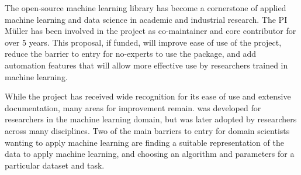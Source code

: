 \vspace{-3mm}
\vspace{-3mm}
The open-source machine learning library \sklearn{} has become a cornerstone of
applied machine learning and data science in academic and industrial research.
The PI M\"uller has been involved in the \sklearn{} project as co-maintainer
and core contributor for over 5 years. This proposal, if funded, will improve
ease of use of the \sklearn{} project, reduce the barrier to entry for
no-experts to use the package, and add automation features that will allow more
effective use by researchers trained in machine learning.

While the \sklearn{} project has received wide recognition for its ease of
use and extensive documentation, many areas for improvement remain.
\sklearn{} was developed for researchers in the machine learning domain,
but was later adopted by researchers across many disciplines.
Two of the main barriers to entry for domain scientists wanting to apply
machine learning are finding a suitable representation of the data to apply
machine learning, and choosing an algorithm and parameters for a particular
dataset and task.

